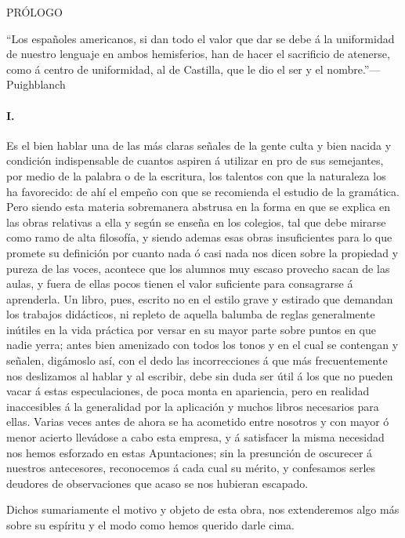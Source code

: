 \documentclass{book}
\begin{document}
PRÓLOGO

``Los españoles americanos, si dan todo el valor que dar 
se debe á la uniformidad de nuestro lenguaje en ambos 
hemisferios, han de hacer el sacrificio de atenerse, como 
á centro de uniformidad, al de Castilla, que le dio el ser 
y el nombre.''---Puighblanch

\paragraph{I.}

Es el bien hablar una de las más claras señales de la gente culta y bien nacida y condición 
indispensable de cuantos aspiren á utilizar en pro de sus semejantes, por medio de la palabra o 
de la escritura, los talentos con que la naturaleza los ha favorecido: de ahí el empeño con que 
se recomienda el estudio de la gramática. Pero siendo esta materia sobremanera abstrusa en la 
forma en que se explica en las obras relativas a ella y según se enseña en los colegios, tal 
que debe mirarse como ramo de alta filosofía, y siendo ademas esas obras insuficientes para lo 
que promete su definición por cuanto nada ó casi nada nos dicen sobre la propiedad y pureza de 
las voces, acontece que los alumnos muy escaso provecho sacan de las aulas, y fuera de ellas 
pocos tienen el valor suficiente para consagrarse á aprenderla. Un libro, pues, escrito no en 
el estilo grave y estirado que demandan los trabajos didácticos, ni repleto de aquella balumba 
de reglas generalmente inútiles en la vida práctica por versar en su mayor parte sobre puntos 
en que nadie yerra; antes bien amenizado con todos los tonos y en el cual se contengan y 
señalen, digámoslo así, con el dedo las incorrecciones á que más frecuentemente nos deslizamos 
al hablar y al escribir, debe sin duda ser útil á los que no pueden vacar á estas 
especulaciones, de poca monta en apariencia, pero en realidad inaccesibles á la generalidad por 
la aplicación y muchos libros necesarios para ellas. Varias veces antes de ahora se ha 
acometido entre nosotros y con mayor ó menor acierto llevádose a cabo esta empresa, y á 
satisfacer la misma necesidad nos hemos esforzado en estas Apuntaciones; sin la presunción de 
oscurecer á nuestros antecesores, reconocemos á cada cual su mérito, y confesamos serles 
deudores de observaciones que acaso se nos hubieran escapado.

Dichos sumariamente el motivo y objeto de esta obra, nos extenderemos algo más sobre su 
espíritu y el modo como hemos querido darle cima.
\end{document}
